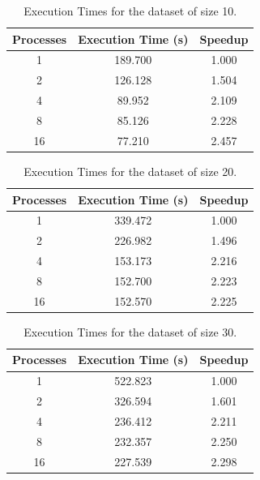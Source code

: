 \documentclass[10pt,twocolumn,letterpaper]{article}
\begin{document}
\begin{table}[H]
	\begin{center}
		\begin{tabular}{|c|c|c|}
			\hline
			Processes & Execution Time (s) & Speedup \\
			\hline
			1 & 189.700 & 1.000 \\
			2 & 126.128 & 1.504 \\
			4 & 89.952 & 2.109 \\
			8 & 85.126 & 2.228 \\
			16 & 77.210 & 2.457 \\
			\hline
		\end{tabular}
	\end{center}
	\caption{Execution Times for the dataset of size 10.}
	\label{tab:speedup_k_d_1}
\end{table}

\begin{table}[H]
	\begin{center}
		\begin{tabular}{|c|c|c|}
			\hline
			Processes & Execution Time (s) & Speedup \\
			\hline
			1 & 339.472 & 1.000 \\
			2 & 226.982 & 1.496 \\
			4 & 153.173 & 2.216 \\
			8 & 152.700 & 2.223 \\
			16 & 152.570 & 2.225 \\
			\hline
		\end{tabular}
	\end{center}
	\caption{Execution Times for the dataset of size 20.}
	\label{tab:speedup_k_d_2}
\end{table}

\begin{table}[H]
	\begin{center}
		\begin{tabular}{|c|c|c|}
			\hline
			Processes & Execution Time (s) & Speedup \\
			\hline
			1 & 522.823 & 1.000 \\
			2 & 326.594 & 1.601 \\
			4 & 236.412 & 2.211 \\
			8 & 232.357 & 2.250 \\
			16 & 227.539 & 2.298 \\
			\hline
		\end{tabular}
	\end{center}
	\caption{Execution Times for the dataset of size 30.}
	\label{tab:speedup_d_3}
\end{table}
\end{document}
